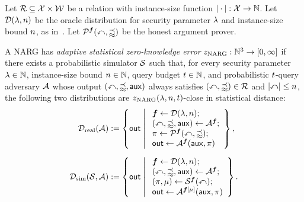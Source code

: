 \begin{definition}
  \label{def:adaptive_zk}
  Let \(\mathcal{R}\subseteq\mathcal X\times\mathcal W\) be a relation with instance-size function \(|\cdot|:\mathcal X\to\mathbb N\). Let \(\mathcal{D}(\lambda,n)\) be the oracle distribution for security parameter \(\lambda\) and instance-size bound \(n\), as in~\cite[Section~9.1]{snarg-book}. Let \(\mathcal{P}^{\boldsymbol{f}}(\mathbb{x},\mathbb{w})\) be the honest argument prover.

  A NARG has \emph{adaptive statistical zero-knowledge error} \(z_{\mathrm{NARG}}:\mathbb N^3\to[0,\infty]\) if there exists a probabilistic simulator \(\mathcal S\) such that, for every security parameter \(\lambda\in\mathbb N\), instance-size bound \(n\in\mathbb N\), query budget \(t\in\mathbb N\), and probabilistic \(t\)-query adversary \(\mathcal{A}\) whose output \((\mathbb{x},\mathbb{w},\mathsf{aux})\) always satisfies \((\mathbb{x},\mathbb{w})\in\mathcal{R}\) and \(|\mathbb{x}|\le n\), the following two distributions are \(z_{\mathrm{NARG}}(\lambda,n,t)\)-close in statistical distance:
  \begin{equation*}
  \begin{aligned}
    \mathcal{D}_{\mathrm{real}}(\mathcal{A})&:=
    \left\{\mathsf{out}\;\middle|\;\begin{array}{l}
      \boldsymbol{f}\leftarrow\mathcal{D}(\lambda,n);\\
      (\mathbb{x},\mathbb{w},\mathsf{aux})\leftarrow\mathcal{A}^{\boldsymbol{f}};\\
      \pi\leftarrow\mathcal{P}^{\boldsymbol{f}}(\mathbb{x},\mathbb{w});\\
      \mathsf{out}\leftarrow\mathcal{A}^{\boldsymbol{f}}(\mathsf{aux},\pi)
    \end{array}\right\},\\[6pt]
    \mathcal{D}_{\mathrm{sim}}(\mathcal S,\mathcal{A})&:=
    \left\{\mathsf{out}\;\middle|\;\begin{array}{l}
      \boldsymbol{f}\leftarrow\mathcal{D}(\lambda,n);\\
      (\mathbb{x},\mathbb{w},\mathsf{aux})\leftarrow\mathcal{A}^{\boldsymbol{f}};\\
      (\pi,\mu)\leftarrow\mathcal S^{\boldsymbol{f}}(\mathbb{x});\\
      \mathsf{out}\leftarrow\mathcal{A}^{\boldsymbol{f}[\mu]}(\mathsf{aux},\pi)
    \end{array}\right\}.
  \end{aligned}
  \end{equation*}


\end{definition}
